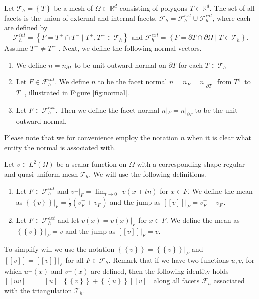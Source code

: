 \documentclass[11pt]{article}
\theoremstyle{remark}
\newcommand{\mean}[1]{\left\{\!\!\left\{#1\right\}\!\!\right\}}
\newcommand{\jump}[1]{\left[\!\left[ #1 \right]\!\right]}
\numberwithin{equation}{section}
\begin{document}
Let $\mathcal{T}_{h}  = \left\{ T \right\} $ be a mesh of $\Omega \subset  \mathbb{R} ^d $ consisting of polygons $T \in \mathbb{R} ^{d}$.
The set of all facets is the union of external and internal facets, $\mathcal{F} _{h} = \mathcal{F} ^{ext}_{h} \cup \mathcal{F} _{h}^{int} $, where each are defined by
\[
            \mathcal{F}^{int} _{h}  = \left\{ F=T^{+}\cap T^{-}  \mid  T^{+}, T^{-} \in \mathcal{T}_{h}  \right\} \text{ and }
            \mathcal{F}^{ext} _{h}  = \left\{ F= \partial T \cap \partial \Omega    \mid  T  \in \mathcal{T}_{h}  \right\}.
\]
Assume $T^{+} \neq T^{-}$ . Next, we define the following normal vectors.
\begin{enumerate}[label=\arabic*)]
    \item We define $ n= n  _{\partial T}$ to be unit outward normal on $\partial T$ for each $T \in \mathcal{T}_{h} $
\item Let $F \in \mathcal{F }^{int} _{h}$. We define $n$ to be the facet normal $ n =  n _F = n | _{\partial T^{+}} $  from $T^{+}$ to $T^{-}$, illustrated in Figure \ref{fig:normal}.
 \item Let $F \in \mathcal{F} ^{ext}_{h}$. Then we define the facet normal $n | _{F} = n | _{\partial T} $ to be the unit outward normal.
\end{enumerate}
Please note that we for convenience employ the notation $n$ when it is clear what entity the normal is associated with.

    Let $v\in L^2( \Omega ) $ be a scalar function on $\Omega$ with a corresponding shape regular and quasi-uniform mesh $\mathcal{T}_{h} $. We will use the following definitions.
    \begin{enumerate}[label=\arabic*)]
        \item Let $F \in \mathcal{F}^{int} _{h}$ and $v^{\pm}| _{F} = \lim_{t\to 0^{+}} v( x \mp tn)   $ for $x \in F$. We define the mean as $\mean{ v} |_{F} = \frac{1}{2} (v^{+}_{F} + v^{-}_{F})   $ and the jump as $\jump{v}|_{F} =  v^{+}_{F} - v^{-}_{F} $.
        \item Let $F \in \mathcal{F}^{ext} _{h}$ and let $ v( x) =  v(x)|_{F} $ for  $x \in F$.
We define the mean as $\mean{ v} |_{F} = v    $ and the jump as $\jump{v}|_{F} = v$.

    \end{enumerate}
    To simplify will we use the notation $\mean{ v } = \mean{ v }|_{F}    $ and $\jump{ v } = \jump{ v }| _{F}    $ for all $F \in \mathcal{F} _{h}$.
    Remark that if we have two functions $u,v$, for which $u^{\pm}( x) $ and $v^{\pm}( x) $ are defined, then the following identity holds $  \jump{ uv }    = \jump{ u }   \mean{ v }    + \mean{ u }  \jump{ v }$ along all facets $ \mathcal{F}_{h} $ associated with the
    triangulation $\mathcal{T} _{h}$.
\end{document}
